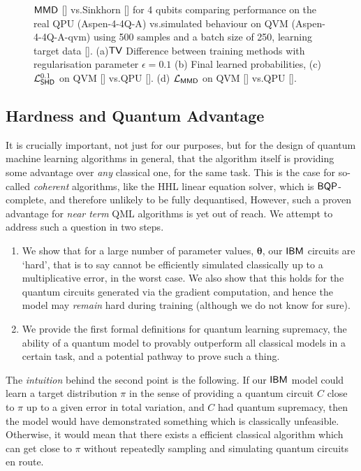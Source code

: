 \begin{figure}[ht]
    \caption{$\operatorname{\textsf{MMD}}$ [\crule[ForestGreen]{0.2cm}{0.2cm}] vs.\@ Sinkhorn [\crule[blue]{0.2cm}{0.2cm}] for 4 qubits comparing performance on the real QPU ({\selectfont Aspen-4-4Q-A}) vs.\@ simulated behaviour on QVM ({\selectfont Aspen-4-4Q-A-qvm}) using 500 samples and a batch size of 250, learning target data [\crule[black]{0.2cm}{0.2cm}]. (a)$\operatorname{\textsf{TV}}$ Difference between training methods with regularisation parameter $\epsilon = 0.1$ (b) Final learned probabilities, (c) $\mathcal{L}^{0.1}_{\operatorname{\textsf{SHD}}}$ on QVM  [\crule[blue]{0.2cm}{0.2cm}] vs.\@ QPU  [\crule[cyan]{0.2cm}{0.2cm}]. (d) $\mathcal{L}_{\operatorname{\textsf{MMD}}}$ on QVM  [\crule[ForestGreen]{0.2cm}{0.2cm}] vs.\@ QPU  [\crule[cyan]{0.2cm}{0.2cm}]. }\label{fig:MMDvSink4_real}
\end{figure}


\subsection*{Hardness and Quantum Advantage}
It is crucially important, not just for our purposes, but for the design of quantum machine learning algorithms in general, that the algorithm itself is providing some advantage over \textit{any} classical one, for the same task. This is the case for so-called \textit{coherent} algorithms, like the HHL linear equation solver\cite{harrow_quantum_2009}, which is $\textsf{BQP}$-complete, and therefore unlikely to be fully dequantised, 
However, such a proven advantage for \textit{near term} QML algorithms is yet out of reach. We attempt to address such a question in two steps. 
\begin{enumerate}
    \item We show that for a large number of parameter values, $\boldsymbol\theta$, our $\textsf{IBM}$ circuits are `hard', that is to say cannot be efficiently simulated classically up to a multiplicative error, in the worst case. We also show that this holds for the quantum circuits generated via the gradient computation, and hence the model may \textit{remain} hard during training (although we do not know for sure).
    \item We provide the first formal definitions for quantum learning supremacy, the ability of a quantum model to provably outperform all classical models in a certain task, and a potential pathway to prove such a thing.
\end{enumerate}

The \emph{intuition} behind the second point is the following. If our $\textsf{IBM}$ model could %
learn a target distribution $\pi$ in the sense of providing a quantum circuit $C$
close to $\pi$ up to a given error in total variation,
and $C$ had %
quantum supremacy, then the model would have demonstrated something which is classically unfeasible. Otherwise, it would mean that there exists a efficient classical algorithm 
which can get close to $\pi$ without repeatedly sampling and simulating quantum circuits 
en route.

